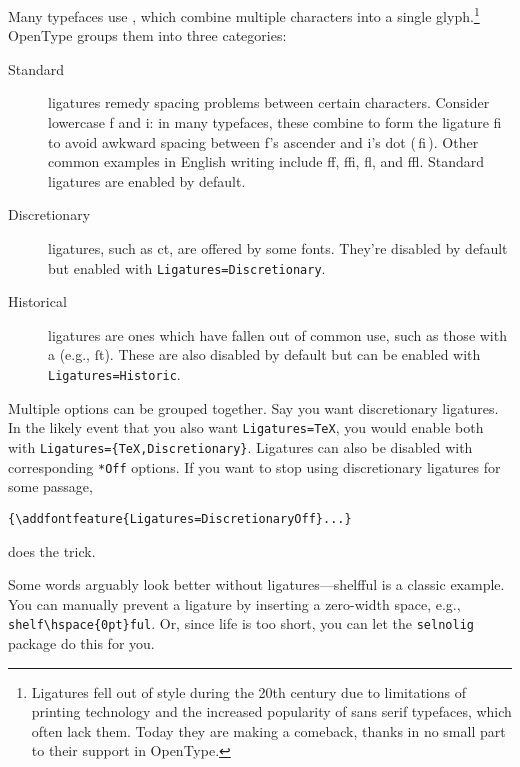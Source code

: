 Many typefaces use , which combine multiple characters
into a single glyph.\punckern\footnote{Ligatures fell out
of style during the 20{th}
century due to limitations of printing technology and the increased popularity
of sans serif typefaces, which often lack them.
Today they are making a comeback,
thanks in no small part to their support in OpenType.}
OpenType groups them into three categories:
\begin{description}
\item[Standard] ligatures remedy spacing problems between certain characters.
    Consider lowercase f and i: in many typefaces,
    these combine to form the ligature fi to avoid
    awkward spacing between f's ascender and i's dot
    { (\,fi\,)}.
    Other common examples in English writing include ff,
    ffi, fl, and ffl.
    Standard ligatures are enabled by default.
\item[Discretionary] ligatures, such as
    {ct},
    are offered by some fonts.
    They're disabled by default but enabled with
    \verb|Ligatures=Discretionary|.
\item[Historical] ligatures are ones which have fallen out of common use,
    such as those with a  (e.g., ſt).
    These are also disabled by default
    but can be enabled with \verb|Ligatures=Historic|.
\end{description}
Multiple options can be grouped together.
Say you want discretionary ligatures.
In the likely event that you also want \verb|Ligatures=TeX|,
you would enable both with
\verb|Ligatures={TeX,Discretionary}|.
Ligatures can also be disabled with corresponding \verb|*Off|
options. If you want to stop using discretionary ligatures for some passage,
\begin{leftfigure}
\begin{lstlisting}
{\addfontfeature{Ligatures=DiscretionaryOff}...}
\end{lstlisting}
\end{leftfigure}
does the trick.

Some words arguably look better without ligatures---\mbox{shelfful}
is a classic example.\punckern{}
You can manually prevent a ligature by inserting a zero-width space, e.g.,
\verb|shelf\hspace{0pt}ful|.
Or, since life is too short, you can let the \texttt{selnolig} package
do this for you.

